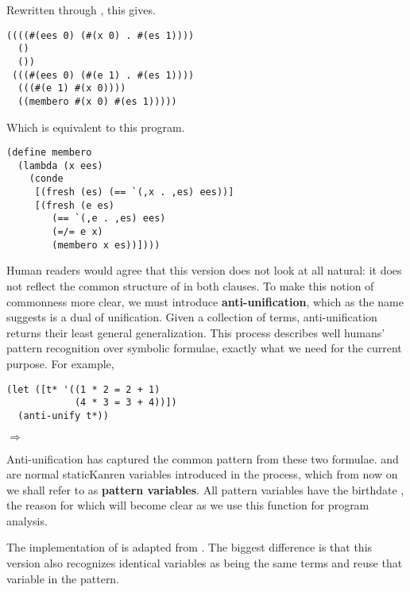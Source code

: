 Rewritten through , this gives.
\begin{lstlisting}
((((#(ees 0) (#(x 0) . #(es 1)))) 
  ()
  ())
 (((#(ees 0) (#(e 1) . #(es 1))))
  (((#(e 1) #(x 0))))
  ((membero #(x 0) #(es 1)))))
\end{lstlisting}
Which is equivalent to this program.
\begin{lstlisting}
(define membero
  (lambda (x ees)
    (conde
     [(fresh (es) (== `(,x . ,es) ees))]
     [(fresh (e es)
        (== `(,e . ,es) ees)
        (=/= e x)
        (membero x es))])))
\end{lstlisting}
Human readers would agree that this version does not look at all natural: it does not reflect the common structure of  in both clauses. To make this notion of commonness more clear, we must introduce \textbf{anti-unification}, which as the name suggests is a dual of unification. Given a collection of terms, anti-unification returns their least general generalization. This process describes well humans' pattern recognition over symbolic formulae, exactly what we need for the current purpose. For example,
\begin{lstlisting}
(let ([t* '((1 * 2 = 2 + 1)
            (4 * 3 = 3 + 4))])
  (anti-unify t*))
\end{lstlisting}
$\Rightarrow$ 

Anti-unification has captured the common pattern from these two formulae.  and  are normal staticKanren variables introduced in the process, which from now on we shall refer to as \textbf{pattern variables}. All pattern variables have the birthdate , the reason for which will become clear as we use this function for program analysis.

The implementation of  is adapted from \textcite{ostvold2004functional}. The biggest difference is that this version also recognizes identical variables as being the same terms and reuse that variable in the pattern. 

